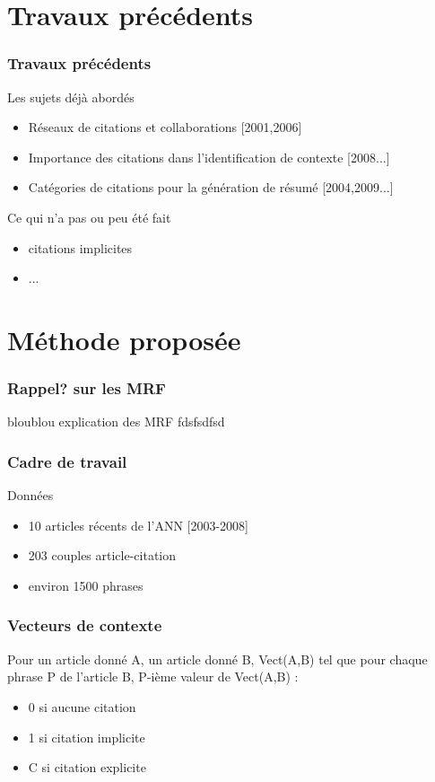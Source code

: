 \documentclass[12pt]{beamer}
\begin{document}
\section{Travaux précédents}
\begin{frame}
  \frametitle{Travaux précédents}
  Les sujets déjà abordés
  \begin{itemize}
    \item Réseaux de citations et collaborations [2001,2006]
    \item Importance des citations dans l'identification de contexte [2008...]
    \item Catégories de citations pour la génération de résumé [2004,2009...]
  \end{itemize}

  Ce qui n'a pas ou peu été fait
  \begin{itemize}
    \item citations implicites
    \item   ...
  \end{itemize}
    
\end{frame}

\section{Méthode proposée}
\begin{frame}
  \frametitle{Rappel? sur les MRF}
  \begin{block}{bloublou explication des MRF}
  fdsfsdfsd
  \end{block}
\end{frame}

\begin{frame}
  \frametitle{Cadre de travail}
  \begin{block}{Données}
  \begin{itemize}
    \item 10 articles récents de l'ANN [2003-2008]
    \item 203 couples article-citation
    \item environ 1500 phrases
  \end{itemize}
  \end{block}
\end{frame}

\begin{frame}
  \frametitle{Vecteurs de contexte}
  Pour un article donné A, un article donné B,
  Vect(A,B) tel que pour chaque phrase P de l'article B, P-ième valeur de Vect(A,B) :
  \begin{itemize}
    \item 0 si aucune citation
    \item 1 si citation implicite
    \item C si citation explicite
  \end{itemize}
\end{frame}
\end{document}
